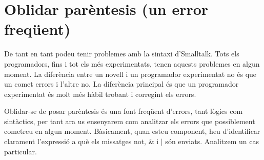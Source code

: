 \section{Oblidar parèntesis (un error freqüent)}

De tant en tant podeu tenir problemes amb la sintaxi d'Smalltalk. Tots els programadors, fins i tot els més experimentats, tenen aquests problemes en algun moment. La diferència entre un novell i un programador experimentat no és que un comet errors i l'altre no. La diferència principal és que un programador experimentat és molt més hàbil trobant i corregint els errors.  

Oblidar-se de posar parèntesis és una font freqüent d'errors, tant lògics com sintàctics, per tant ara us ensenyarem com analitzar els errors que possiblement cometreu en algun moment. Bàsicament, quan esteu component, heu d'identificar clarament l'expressió a què els missatges \textsf{not}, \textsf{\&} i \textsf{$|$} són enviats. Analitzem un cas particular.

